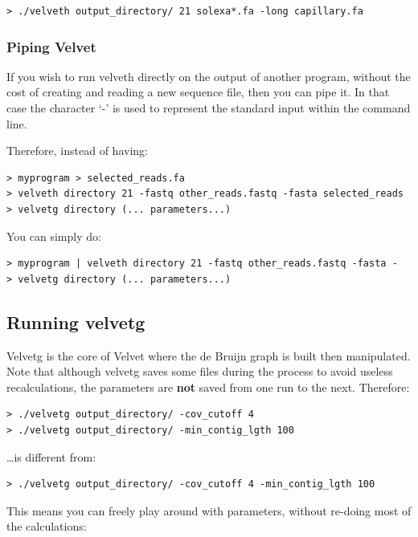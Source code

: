 \documentclass{article}
\begin{document}
\begin{verbatim}
> ./velveth output_directory/ 21 solexa*.fa -long capillary.fa
\end{verbatim}

\subsubsection{Piping Velvet}

If you wish to run velveth directly on the output of another program, without the cost of creating and reading a new sequence file, then you can pipe it. In that case the character `-' is used to represent the standard input within the command line. 

Therefore, instead of having:

\begin{verbatim}
> myprogram > selected_reads.fa
> velveth directory 21 -fastq other_reads.fastq -fasta selected_reads
> velvetg directory (... parameters...) 
\end{verbatim}

You can simply do:

\begin{verbatim}
> myprogram | velveth directory 21 -fastq other_reads.fastq -fasta -
> velvetg directory (... parameters...) 
\end{verbatim}

\subsection{Running velvetg}

Velvetg is the core of Velvet where the de Bruijn graph is built then manipulated. Note that although velvetg saves some files during the process to avoid useless recalculations, the parameters are \textbf{not} saved from one run to the next. Therefore:

\begin{verbatim}
> ./velvetg output_directory/ -cov_cutoff 4
> ./velvetg output_directory/ -min_contig_lgth 100
\end{verbatim}

\ldots is different from:

\begin{verbatim}
> ./velvetg output_directory/ -cov_cutoff 4 -min_contig_lgth 100
\end{verbatim}

This means you can freely play around with parameters, without re-doing most of the calculations:
\end{document}

